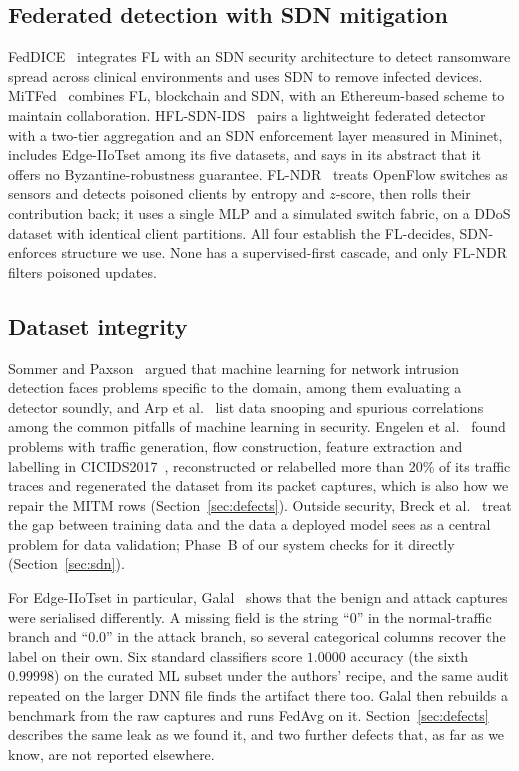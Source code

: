 \subsection{Federated detection with SDN mitigation}
FedDICE~\cite{thapa2021feddice} integrates FL with an SDN security architecture to detect ransomware spread across clinical environments and uses SDN to remove infected devices. MiTFed~\cite{abouelhouda2023mitfed} combines FL, blockchain and SDN, with an Ethereum-based scheme to maintain collaboration. HFL-SDN-IDS~\cite{baghalzadeh2026} pairs a lightweight federated detector with a two-tier aggregation and an SDN enforcement layer measured in Mininet, includes Edge-IIoTset among its five datasets, and says in its abstract that it offers no Byzantine-robustness guarantee. FL-NDR~\cite{pillai2026} treats OpenFlow switches as sensors and detects poisoned clients by entropy and $z$-score, then rolls their contribution back; it uses a single MLP and a simulated switch fabric, on a DDoS dataset with identical client partitions. All four establish the FL-decides, SDN-enforces structure we use. None has a supervised-first cascade, and only FL-NDR filters poisoned updates.

\subsection{Dataset integrity}
Sommer and Paxson~\cite{sommer2010} argued that machine learning for network intrusion detection faces problems specific to the domain, among them evaluating a detector soundly, and Arp et al.~\cite{arp2022} list data snooping and spurious correlations among the common pitfalls of machine learning in security. Engelen et al.~\cite{engelen2021} found problems with traffic generation, flow construction, feature extraction and labelling in CICIDS2017~\cite{sharafaldin2018}, reconstructed or relabelled more than 20\% of its traffic traces and regenerated the dataset from its packet captures, which is also how we repair the MITM rows (Section~\ref{sec:defects}). Outside security, Breck et al.~\cite{breck2019} treat the gap between training data and the data a deployed model sees as a central problem for data validation; Phase~B of our system checks for it directly (Section~\ref{sec:sdn}).

For Edge-IIoTset in particular, Galal~\cite{galal2026} shows that the benign and attack captures were serialised differently. A missing field is the string ``0'' in the normal-traffic branch and ``0.0'' in the attack branch, so several categorical columns recover the label on their own. Six standard classifiers score $1.0000$ accuracy (the sixth $0.99998$) on the curated ML subset under the authors' recipe, and the same audit repeated on the larger DNN file finds the artifact there too. Galal then rebuilds a benchmark from the raw captures and runs FedAvg on it. Section~\ref{sec:defects} describes the same leak as we found it, and two further defects that, as far as we know, are not reported elsewhere.

